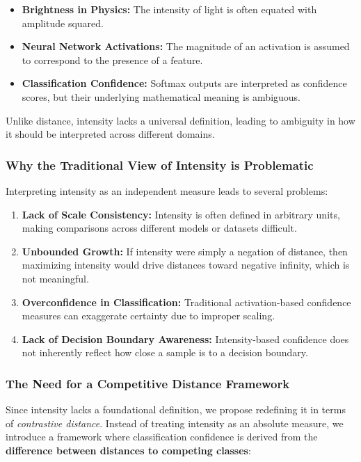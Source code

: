 \begin{itemize}
    \item \textbf{Brightness in Physics:} The intensity of light is often equated with amplitude squared.
    \item \textbf{Neural Network Activations:} The magnitude of an activation is assumed to correspond to the presence of a feature.
    \item \textbf{Classification Confidence:} Softmax outputs are interpreted as confidence scores, but their underlying mathematical meaning is ambiguous.
\end{itemize}

Unlike distance, intensity lacks a universal definition, leading to ambiguity in how it should be interpreted across different domains.

\subsubsection{Why the Traditional View of Intensity is Problematic}

Interpreting intensity as an independent measure leads to several problems:

\begin{enumerate}
    \item \textbf{Lack of Scale Consistency:} Intensity is often defined in arbitrary units, making comparisons across different models or datasets difficult.
    \item \textbf{Unbounded Growth:} If intensity were simply a negation of distance, then maximizing intensity would drive distances toward negative infinity, which is not meaningful.
    \item \textbf{Overconfidence in Classification:} Traditional activation-based confidence measures can exaggerate certainty due to improper scaling.
    \item \textbf{Lack of Decision Boundary Awareness:} Intensity-based confidence does not inherently reflect how close a sample is to a decision boundary.
\end{enumerate}

\subsubsection{The Need for a Competitive Distance Framework}

Since intensity lacks a foundational definition, we propose redefining it in terms of \textit{contrastive distance}. Instead of treating intensity as an absolute measure, we introduce a framework where classification confidence is derived from the \textbf{difference between distances to competing classes}:

